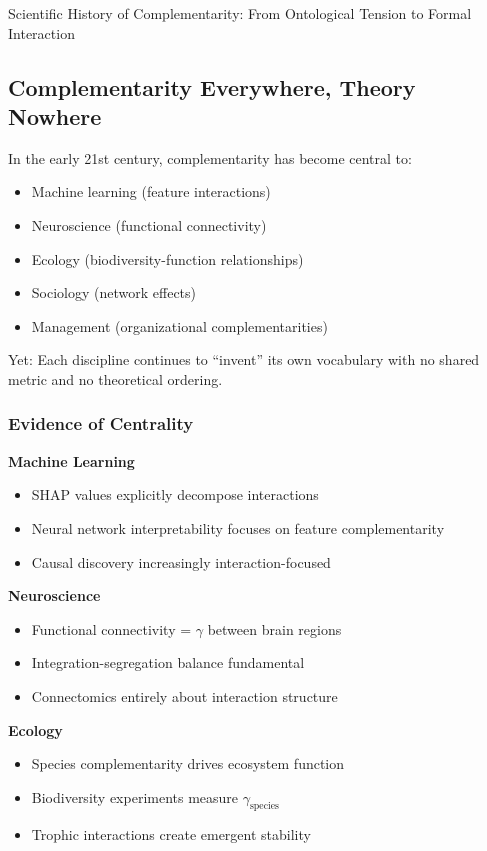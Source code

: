 \begin{chapter}{Scientific History of Complementarity: From Ontological Tension to Formal Interaction}
\subsection{Complementarity Everywhere, Theory Nowhere}

\begin{tcolorbox}[colback=red!5!white,colframe=red!75!black,title=\textbf{The Contemporary Bottleneck}]
In the early 21st century, complementarity has become central to:
\begin{itemize}[noitemsep]
    \item Machine learning (feature interactions)
    \item Neuroscience (functional connectivity)
    \item Ecology (biodiversity-function relationships)
    \item Sociology (network effects)
    \item Management (organizational complementarities)
\end{itemize}

Yet: Each discipline continues to ``invent'' its own vocabulary with no shared metric and no theoretical ordering.
\end{tcolorbox}

\subsubsection{Evidence of Centrality}

\textbf{Machine Learning}
\begin{itemize}[noitemsep]
    \item SHAP values explicitly decompose interactions
    \item Neural network interpretability focuses on feature complementarity
    \item Causal discovery increasingly interaction-focused
\end{itemize}

\textbf{Neuroscience}
\begin{itemize}[noitemsep]
    \item Functional connectivity = $\gamma$ between brain regions
    \item Integration-segregation balance fundamental
    \item Connectomics entirely about interaction structure
\end{itemize}

\textbf{Ecology}
\begin{itemize}[noitemsep]
    \item Species complementarity drives ecosystem function
    \item Biodiversity experiments measure $\gamma_{\text{species}}$
    \item Trophic interactions create emergent stability
\end{itemize}


\end{chapter}
